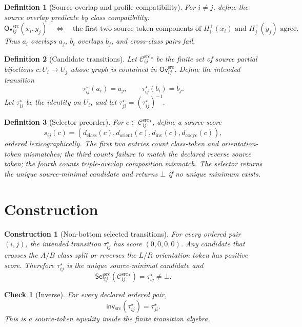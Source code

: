 \documentclass[11pt]{article}
\newcommand{\Ovsrc}{\mathsf{Ov}^{\mathrm{src}}}
\newcommand{\Prof}{\Pi^{+}}
\newcommand{\Cand}{\mathcal{C}^{\mathrm{src}}}
\newcommand{\Sel}{\mathsf{Sel}^{\mathrm{src}}}
\newcommand{\Bot}{\bot}
\newtheorem{definition}{Definition}
\newtheorem{construction}{Construction}
\newtheorem{checkresult}{Check}
\begin{document}
\begin{definition}[Source overlap and profile compatibility]
For \(i\neq j\), define the source overlap predicate by class compatibility:
\[
  \Ovsrc_{ij}(x_i,y_j)
  \quad\Longleftrightarrow\quad
  \text{the first two source-token components of }\Prof_i(x_i)
  \text{ and }\Prof_j(y_j)\text{ agree}.
\]
Thus \(a_i\) overlaps \(a_j\), \(b_i\) overlaps \(b_j\), and cross-class
pairs fail.
\end{definition}

\begin{definition}[Candidate transitions]
Let \(\Cand_{ij}^{\star}\) be the finite set of source partial bijections
\(c:U_i\to U_j\) whose graph is contained in \(\Ovsrc_{ij}\). Define the
intended transition
\[
  \tau_{ij}^{\star}(a_i)=a_j,\qquad
  \tau_{ij}^{\star}(b_i)=b_j.
\]
Let \(\tau_{ii}^{\star}\) be the identity on \(U_i\), and let
\(\tau_{ji}^{\star}=(\tau_{ij}^{\star})^{-1}\).
\end{definition}

\begin{definition}[Selector preorder]
For \(c\in\Cand_{ij}^{\star}\), define a source score
\[
  s_{ij}(c)=
  (d_{\mathrm{class}}(c),d_{\mathrm{orient}}(c),d_{\mathrm{inv}}(c),
  d_{\mathrm{cocyc}}(c)),
\]
ordered lexicographically. The first two entries count class-token and
orientation-token mismatches; the third counts failure to match the declared
reverse source token; the fourth counts triple-overlap composition mismatch.
The selector returns the unique source-minimal candidate and returns
\(\Bot\) if no unique minimum exists.
\end{definition}

\section{Construction}

\begin{construction}[Non-bottom selected transitions]
For every ordered pair \((i,j)\), the intended transition
\(\tau_{ij}^{\star}\) has score \((0,0,0,0)\). Any candidate that crosses
the \(A/B\) class split or reverses the \(L/R\) orientation token has positive
score. Therefore \(\tau_{ij}^{\star}\) is the unique source-minimal
candidate and
\[
  \Sel_{ij}(\Cand_{ij}^{\star})=\tau_{ij}^{\star}\neq\Bot.
\]
\end{construction}

\begin{checkresult}[Inverse]
For every declared ordered pair,
\[
  \mathsf{inv}_{\mathrm{src}}(\tau_{ij}^{\star})=\tau_{ji}^{\star}.
\]
This is a source-token equality inside the finite transition algebra.
\end{checkresult}
\end{document}
